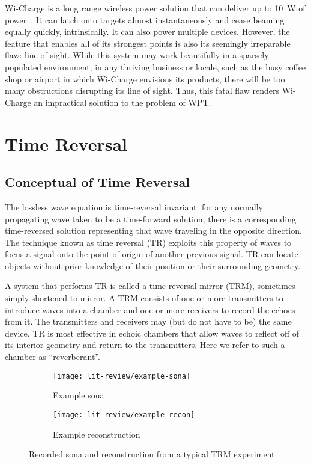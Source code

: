 Wi-Charge is a long range wireless power solution that can deliver up to 10~W of power~\cite{wicharge2016}. It can latch onto targets almost instantaneously and cease beaming equally quickly, intrinsically. It can also power multiple devices. However, the feature that enables all of its strongest points is also its seemingly irreparable flaw: line-of-sight. While this system may work beautifully in a sparsely populated environment, in any thriving business or locale, such as the busy coffee shop or airport in which Wi-Charge envisions its products, there will be too many obstructions disrupting its line of sight. Thus, this fatal flaw renders Wi-Charge an impractical solution to the problem of WPT.

\section{Time Reversal}
\label{lit-review-tr}

\subsection{Conceptual of Time Reversal}

The lossless wave equation is time-reversal invariant: for any normally propagating wave taken to be a time-forward solution, there is a corresponding time-reversed solution representing that wave traveling in the opposite direction. The technique known as time reversal (TR) exploits this property of waves to focus a signal onto the point of origin of another previous signal. TR can locate objects without prior knowledge of their position or their surrounding geometry.

A system that performs TR is called a time reversal mirror (TRM), sometimes simply shortened to mirror. A TRM consists of one or more transmitters to introduce waves into a chamber and one or more receivers to record the echoes from it. The transmitters and receivers may (but do not have to be) the same device. TR is most effective in echoic chambers that allow waves to reflect off of its interior geometry and return to the transmitters. Here we refer to such a chamber as ``reverberant''.

\begin{figure}[h!]
    \centering
    \begin{subfigure}{.45\textwidth}
        \centering
        \texttt{[image: lit-review/example-sona]}
        \caption[Example sona]{Example sona}
         \label{fig:lit-review-example-sona}
    \end{subfigure}
    \begin{subfigure}{.45\textwidth}
        \centering
        \texttt{[image: lit-review/example-recon]}
        \caption[Example reconstruction]{Example reconstruction}
         \label{fig:lit-review-example-recon}
    \end{subfigure}
    \caption{Recorded sona and reconstruction from a typical TRM experiment}
    \label{fig:lit-review-example}
\end{figure}

